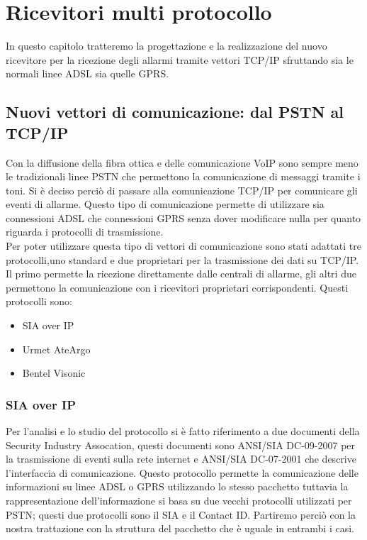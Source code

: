 \chapter{Ricevitori multi protocollo}
\label{capitolo4}
\thispagestyle{empty}
In questo capitolo tratteremo la progettazione e la realizzazione del nuovo  ricevitore per la ricezione degli allarmi tramite vettori TCP/IP sfruttando sia le normali linee ADSL sia quelle GPRS.
\section{Nuovi vettori di comunicazione: dal PSTN al TCP/IP}
Con la diffusione della fibra ottica e delle comunicazione VoIP sono sempre meno le tradizionali linee PSTN che permettono la comunicazione di messaggi tramite i toni. Si è deciso perciò di passare alla comunicazione TCP/IP per comunicare gli eventi di allarme. Questo tipo di comunicazione permette di utilizzare sia connessioni ADSL che connessioni GPRS senza dover modificare nulla per quanto riguarda i protocolli di trasmissione.\\
Per poter utilizzare questa tipo di vettori di comunicazione sono stati adattati tre protocolli,uno standard e due proprietari per la trasmissione dei dati su TCP/IP. Il primo permette la ricezione direttamente dalle centrali di allarme, gli altri due permettono la comunicazione con i ricevitori proprietari corrispondenti. Questi protocolli sono:
\begin{itemize}
	\item SIA over IP
	\item Urmet AteArgo
	\item Bentel Visonic
\end{itemize}
\subsection{SIA over IP}
Per l'analisi e lo studio del protocollo si è fatto riferimento a due documenti della Security Industry Assocation, questi documenti sono ANSI/SIA DC-09-2007\cite{dc09} per la trasmissione di eventi sulla rete internet e ANSI/SIA DC-07-2001\cite{dc07} che descrive l'interfaccia di comunicazione.
Questo protocollo permette la comunicazione delle informazioni su linee ADSL o GPRS utilizzando lo stesso pacchetto tuttavia la rappresentazione dell'informazione si basa su due vecchi protocolli utilizzati per PSTN; questi due protocolli sono il SIA e il Contact ID. Partiremo perciò con la nostra trattazione con la struttura del pacchetto che è uguale in entrambi i casi.
